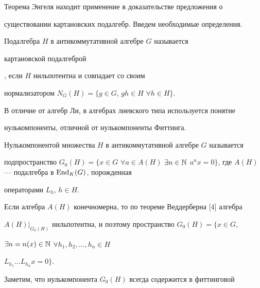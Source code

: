  


Теорема Энгеля находит применение в доказательстве предложения о  


существовании картановских подалгебр. Введем необходимые определения. 


 


 


\begin{defn} 


Подалгебра $H$ в антикоммутативной алгебре $G$ называется {\it 


картановской подалгеброй}, если $H$ нильпотентна и совпадает со своим 


нормализатором $N_G(H)=\{g\in G$, $gh\in H$ $\forall h\in H\}$.  


\end{defn} 


 


В отличие от алгебр Ли, в алгебрах лиевского типа используется понятие  


нулькомпоненты, отличной от нулькомпоненты Фиттинга. 


 


 


\begin{defn} 


Нулькомпонентой множества $H$ в антикоммутативной алгебре $G$ называется 


подпространство $G_0(H)=\{x\in G$ $\forall a\in A(H)$ $\exists n\in\Bbb 


N$ $a^nx=0\}$, где $A(H)$ --- подалгебра в $\End_K(G)$, порожденная 


операторами $L_h$, $h\in H$.  


\end{defn} 


 


Если алгебра $A(H)$ конечномерна, то по теореме Веддерберна [4] алгебра 


$A(H)|_{G_0(H)}$ нильпотентна, и поэтому пространство $G_0(H)=\{x\in G$, 


$\exists n=n(x)\in\Bbb N$ $\forall h_1,h_2,\dotsc,h_n\in H$ 


$L_{h_1}\dotsc L_{h_n}x=0\}$. 


 


Заметим, что нулькомпонента $G_0(H)$ всегда содержится в фиттинговой 


